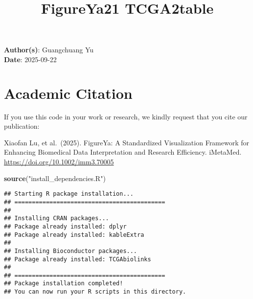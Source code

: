 \documentclass[
]{article}
\title{FigureYa21 TCGA2table}
\author{}
\date{\vspace{-2.5em}}
\newenvironment{Shaded}{\begin{snugshade}}{\end{snugshade}}
\newcommand{\FunctionTok}[1]{\textcolor[rgb]{0.13,0.29,0.53}{\textbf{#1}}}
\newcommand{\NormalTok}[1]{#1}
\newcommand{\StringTok}[1]{\textcolor[rgb]{0.31,0.60,0.02}{#1}}
\begin{document}
\maketitle

\textbf{Author(s)}: Guangchuang Yu\\
\textbf{Date}: 2025-09-22

\section{Academic Citation}\label{academic-citation}

If you use this code in your work or research, we kindly request that
you cite our publication:

Xiaofan Lu, et al.~(2025). FigureYa: A Standardized Visualization
Framework for Enhancing Biomedical Data Interpretation and Research
Efficiency. iMetaMed. \url{https://doi.org/10.1002/imm3.70005}

\begin{Shaded}
\begin{Highlighting}[]
\FunctionTok{source}\NormalTok{(}\StringTok{"install\_dependencies.R"}\NormalTok{)}
\end{Highlighting}
\end{Shaded}

\begin{verbatim}
## Starting R package installation...
## ===========================================
## 
## Installing CRAN packages...
## Package already installed: dplyr 
## Package already installed: kableExtra 
## 
## Installing Bioconductor packages...
## Package already installed: TCGAbiolinks 
## 
## ===========================================
## Package installation completed!
## You can now run your R scripts in this directory.
\end{verbatim}
\end{document}
